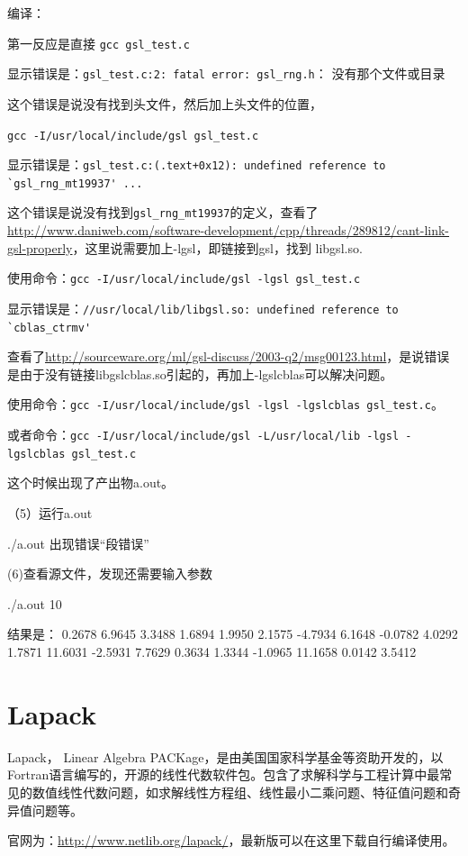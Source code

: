 编译：

第一反应是直接 \verb|gcc gsl_test.c|

显示错误是：\verb|gsl_test.c:2: fatal error: gsl_rng.h|： 没有那个文件或目录

这个错误是说没有找到头文件，然后加上头文件的位置，

\verb|gcc -I/usr/local/include/gsl gsl_test.c|

显示错误是：\verb|gsl_test.c:(.text+0x12): undefined reference to `gsl_rng_mt19937' ...|

这个错误是说没有找到\verb|gsl_rng_mt19937|的定义，查看了\url{http://www.daniweb.com/software-development/cpp/threads/289812/cant-link-gsl-properly}，这里说需要加上-lgsl，即链接到gsl，找到 libgsl.so.

使用命令：\verb|gcc -I/usr/local/include/gsl -lgsl gsl_test.c|

显示错误是：\verb|//usr/local/lib/libgsl.so: undefined reference to `cblas_ctrmv'|

查看了\url{http://sourceware.org/ml/gsl-discuss/2003-q2/msg00123.html}，是说错误是由于没有链接libgslcblas.so引起的，再加上-lgslcblas可以解决问题。

使用命令：\verb|gcc -I/usr/local/include/gsl -lgsl -lgslcblas gsl_test.c|。

或者命令：\verb|gcc -I/usr/local/include/gsl -L/usr/local/lib -lgsl -lgslcblas gsl_test.c|

这个时候出现了产出物a.out。

（5）运行a.out 

./a.out 出现错误“段错误”

(6)查看源文件，发现还需要输入参数

./a.out 10

结果是：
0.2678 6.9645
3.3488 1.6894
1.9950 2.1575
-4.7934 6.1648
-0.0782 4.0292
1.7871 11.6031
-2.5931 7.7629
0.3634 1.3344
-1.0965 11.1658
0.0142 3.5412



\section{Lapack}
Lapack， Linear Algebra PACKage，是由美国国家科学基金等资助开发的，以Fortran语言编写的，开源的线性代数软件包。包含了求解科学与工程计算中最常见的数值线性代数问题，如求解线性方程组、线性最小二乘问题、特征值问题和奇异值问题等。

官网为：\url{http://www.netlib.org/lapack/}，最新版可以在这里下载自行编译使用。

